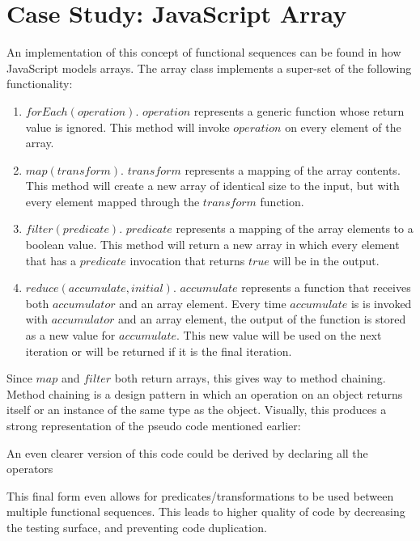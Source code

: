 \section{Case Study: JavaScript Array}

An implementation of this concept of functional sequences can be found in how JavaScript models arrays.  The array class implements a super-set of the following functionality:

\begin{enumerate}
  \item $forEach(operation)$.  $operation$ represents a generic function whose return value is ignored.  This method will invoke $operation$ on every element of the array.

  \item $map(transform)$.  $transform$ represents a mapping of the array contents.  This method will create a new array of identical size to the input, but with every element mapped through the $transform$ function.

  \item $filter(predicate)$.  $predicate$ represents a mapping of the array elements to a boolean value.  This method will return a new array in which every element that has a $predicate$ invocation that returns $true$ will be in the output.

  \item $reduce(accumulate, initial)$.  $accumulate$ represents a function that receives both $accumulator$ and an array element. Every time $accumulate$ is is invoked with $accumulator$ and an array element, the output of the function is stored as a new value for $accumulate$.  This new value will be used on the next iteration or will be returned if it is the final iteration.

\end{enumerate}

Since $map$ and $filter$ both return arrays, this gives way to method chaining. Method chaining is a design pattern in which an operation on an object returns itself or an instance of the same type as the object. Visually, this produces a strong representation of the pseudo code mentioned earlier:

\begin{minipage}{\linewidth}

\end{minipage} 

An even clearer version of this code could be derived by declaring all the operators

\begin{minipage}{\linewidth}

\end{minipage}

This final form even allows for predicates/transformations to be used between multiple functional sequences.  This leads to higher quality of code by decreasing the testing surface, and preventing code duplication. 